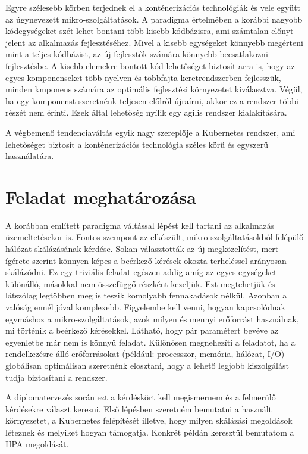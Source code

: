 Egyre szélesebb körben terjednek el a konténerizációs technológiák és vele együtt az úgynevezett mikro-szolgáltatások.
A paradigma értelmében a korábbi nagyobb kódegységeket szét lehet bontani több kisebb kódbázisra, ami számtalan előnyt jelent az alkalmazás fejlesztéséhez.
Mivel a kisebb egységeket könnyebb megérteni mint a teljes kódbázist, az új fejlesztők számára könnyebb becsatlakozni fejlesztésbe.
A kisebb elemekre bontott kód lehetőséget biztosít arra is, hogy az egyes komponenseket több
nyelven és többfajta keretrendszerben fejlesszük, minden kmponens számára az optimális fejlesztési környezetet kiválasztva. 
Végül, ha egy komponenst szeretnénk teljesen előlről újraírni, akkor ez a rendszer többi részét nem érinti.
Ezek által lehetőség nyílik egy agilis rendszer kialakítására.

A végbemenő tendenciaváltás egyik nagy szereplője a Kubernetes rendszer, ami lehetőséget biztosít a konténerizációs technológia széles körű és egyszerű használatára.

\section{Feladat meghatározása}
A korábban említett paradigma váltással lépést kell tartani az alkalmazás üzemeltetésekor is. 
Fontos szempont az elkészült, mikro-szolgáltatásokból felépülő hálózat skálázásának kérdése. 
Sokan választották az új megközelítést, mert ígérete szerint könnyen képes a beérkező kérések okozta terheléssel arányosan skálázódni.
Ez egy triviális feladat egészen addig amíg az egyes egységeket különálló, másokkal nem összefüggő részként kezeljük.
Ezt megtehetjük és látszólag legtöbben meg is teszik komolyabb fennakadások nélkül. 
Azonban a valóság ennél jóval komplexebb. Figyelembe kell venni, hogyan kapcsolódnak egymáshoz a mikro-szolgáltatások, azok milyen és mennyi erőforrást használnak, mi történik a beérkező kérésekkel.
Látható, hogy pár paramétert bevéve az egyenletbe már nem is könnyű feladat. 
Különösen megnehezíti a feladatot, ha a rendelkezésre álló erőforrásokat (például: processzor, memória, hálózat, I/O) globálisan optimálisan szeretnénk elosztani, hogy a lehető legjobb kiszolgálást tudja biztosítani a rendszer. 

A diplomatervezés során ezt a kérdéskört kell megismernem és a felmerülő kérdésekre választ keresni. 
Első lépésben szeretném bemutatni a használt környezetet, a Kubernetes felépítését illetve, hogy
milyen skálázási megoldások léteznek és melyiket hogyan támogatja.
Konkrét példán keresztül bemutatom a HPA megoldását. 

